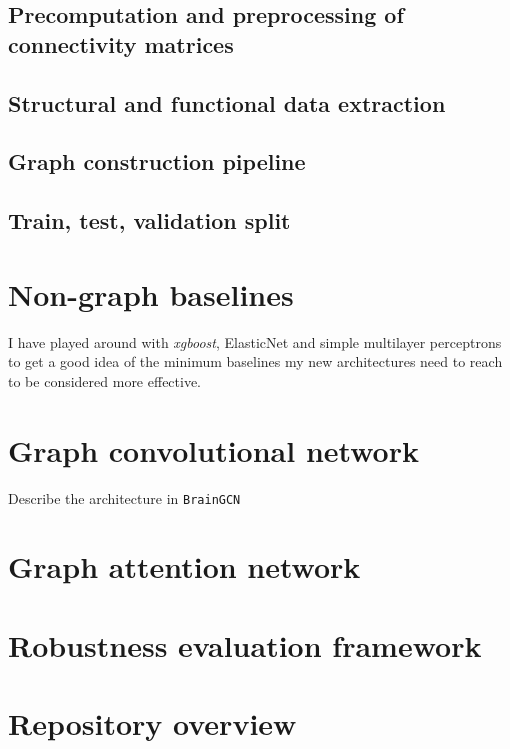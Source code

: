 \documentclass[12pt,a4paper,twoside, openright, hidelinks]{report}
\begin{document}
\subsection{Precomputation and preprocessing of connectivity matrices}

\subsection{Structural and functional data extraction}

\subsection{Graph construction pipeline}

\subsection{Train, test, validation split}

\section{Non-graph baselines}
I have played around with \textit{xgboost}, ElasticNet and simple multilayer perceptrons to get a good idea of the minimum baselines my new architectures need to reach to be considered more effective.

\section{Graph convolutional network}
Describe the architecture in \texttt{BrainGCN}

\section{Graph attention network}

\section{Robustness evaluation framework}

\section{Repository overview}
\end{document}
